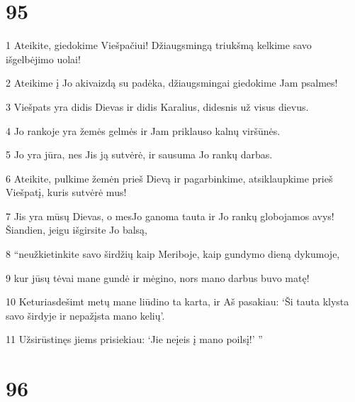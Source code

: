 \chapter{95}


\par 1 Ateikite, giedokime Viešpačiui! Džiaugsmingą triukšmą kelkime savo išgelbėjimo uolai! 
\par 2 Ateikime į Jo akivaizdą su padėka, džiaugsmingai giedokime Jam psalmes! 
\par 3 Viešpats yra didis Dievas ir didis Karalius, didesnis už visus dievus. 
\par 4 Jo rankoje yra žemės gelmės ir Jam priklauso kalnų viršūnės. 
\par 5 Jo yra jūra, nes Jis ją sutvėrė, ir sausuma Jo rankų darbas. 
\par 6 Ateikite, pulkime žemėn prieš Dievą ir pagarbinkime, atsiklaupkime prieš Viešpatį, kuris sutvėrė mus! 
\par 7 Jis yra mūsų Dievas, o mes­Jo ganoma tauta ir Jo rankų globojamos avys! Šiandien, jeigu išgirsite Jo balsą,­ 
\par 8 “neužkietinkite savo širdžių kaip Meriboje, kaip gundymo dieną dykumoje, 
\par 9 kur jūsų tėvai mane gundė ir mėgino, nors mano darbus buvo matę! 
\par 10 Keturiasdešimt metų mane liūdino ta karta, ir Aš pasakiau: ‘Ši tauta klysta savo širdyje ir nepažįsta mano kelių’. 
\par 11 Užsirūstinęs jiems prisiekiau: ‘Jie neįeis į mano poilsį!’ ”


\chapter{96}



